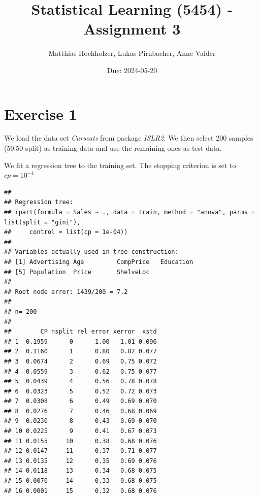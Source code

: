 \documentclass[
]{article}
\title{Statistical Learning (5454) - Assignment 3}
\author{Matthias Hochholzer, Lukas Pirnbacher, Anne Valder}
\date{Due: 2024-05-20}
\begin{document}
\maketitle

\section{Exercise 1}\label{exercise-1}

We load the data set \textit{Carseats} from package \textit{ISLR2}. We
then select 200 samples (50:50 split) as training data and use the
remaining ones as test data.

We fit a regression tree to the training set. The stopping criterion is
set to \(cp = 10^{-4}\)

\begin{verbatim}
## 
## Regression tree:
## rpart(formula = Sales ~ ., data = train, method = "anova", parms = list(split = "gini"), 
##     control = list(cp = 1e-04))
## 
## Variables actually used in tree construction:
## [1] Advertising Age         CompPrice   Education  
## [5] Population  Price       ShelveLoc  
## 
## Root node error: 1439/200 = 7.2
## 
## n= 200 
## 
##        CP nsplit rel error xerror  xstd
## 1  0.1959      0      1.00   1.01 0.096
## 2  0.1160      1      0.80   0.82 0.077
## 3  0.0674      2      0.69   0.75 0.072
## 4  0.0559      3      0.62   0.75 0.077
## 5  0.0439      4      0.56   0.78 0.078
## 6  0.0323      5      0.52   0.72 0.073
## 7  0.0308      6      0.49   0.69 0.070
## 8  0.0276      7      0.46   0.68 0.069
## 9  0.0230      8      0.43   0.69 0.070
## 10 0.0225      9      0.41   0.67 0.073
## 11 0.0155     10      0.38   0.68 0.076
## 12 0.0147     11      0.37   0.71 0.077
## 13 0.0135     12      0.35   0.69 0.076
## 14 0.0118     13      0.34   0.68 0.075
## 15 0.0070     14      0.33   0.68 0.075
## 16 0.0001     15      0.32   0.68 0.076
\end{verbatim}
\end{document}
